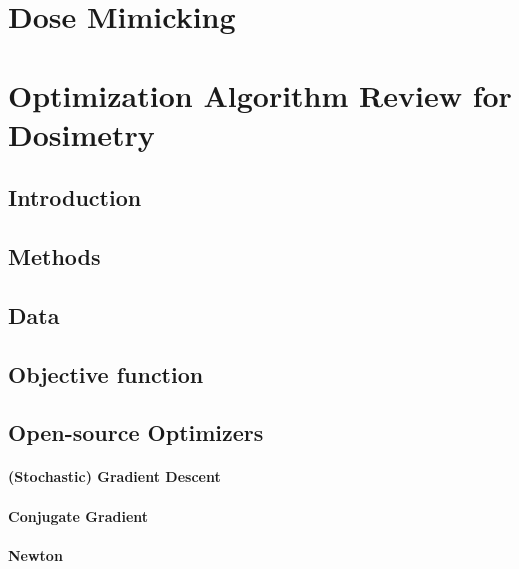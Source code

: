 \section{Dose Mimicking}

\section{Optimization Algorithm Review for Dosimetry}
\subsection{Introduction}

\subsection{Methods}

\subsection{Data}
\subsection{Objective function}
\subsection{Open-source Optimizers}
\paragraph{(Stochastic) Gradient Descent}
\paragraph{Conjugate Gradient}
\paragraph{Newton}
